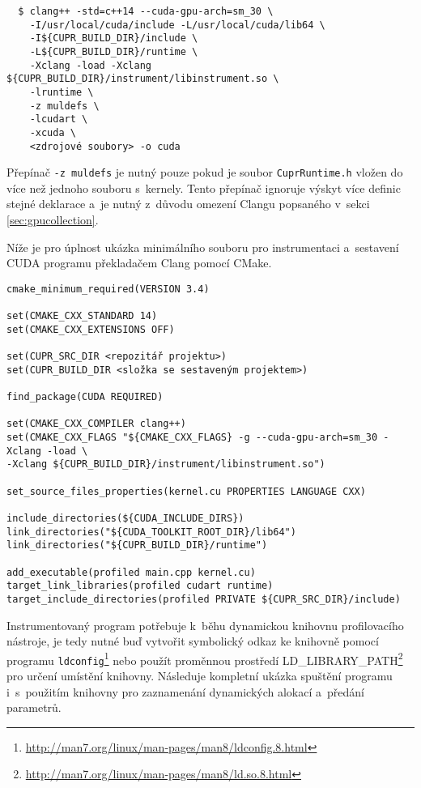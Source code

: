 \noindent
\begin{minipage}{\textwidth}
\begin{verbatim}
  $ clang++ -std=c++14 --cuda-gpu-arch=sm_30 \
	-I/usr/local/cuda/include -L/usr/local/cuda/lib64 \
	-I${CUPR_BUILD_DIR}/include \
	-L${CUPR_BUILD_DIR}/runtime \
	-Xclang -load -Xclang ${CUPR_BUILD_DIR}/instrument/libinstrument.so \
	-lruntime \
	-z muldefs \
	-lcudart \
	-xcuda \
	<zdrojové soubory> -o cuda
\end{verbatim}
\end{minipage}

\vspace{5mm}
Přepínač \texttt{-z\ muldefs} je nutný pouze pokud je soubor \texttt{CuprRuntime.h} vložen do více než jednoho souboru s~kernely. Tento přepínač ignoruje výskyt více definic stejné deklarace a~je nutný z~důvodu omezení Clangu popsaného v~sekci \ref{sec:gpucollection}.

Níže je pro úplnost ukázka minimálního souboru pro instrumentaci a~sestavení CUDA programu překladačem Clang pomocí CMake.


\begin{verbatim}
cmake_minimum_required(VERSION 3.4)

set(CMAKE_CXX_STANDARD 14)
set(CMAKE_CXX_EXTENSIONS OFF)

set(CUPR_SRC_DIR <repozitář projektu>)
set(CUPR_BUILD_DIR <složka se sestaveným projektem>)

find_package(CUDA REQUIRED)

set(CMAKE_CXX_COMPILER clang++)
set(CMAKE_CXX_FLAGS "${CMAKE_CXX_FLAGS} -g --cuda-gpu-arch=sm_30 -Xclang -load \
-Xclang ${CUPR_BUILD_DIR}/instrument/libinstrument.so")

set_source_files_properties(kernel.cu PROPERTIES LANGUAGE CXX)

include_directories(${CUDA_INCLUDE_DIRS})
link_directories("${CUDA_TOOLKIT_ROOT_DIR}/lib64")
link_directories("${CUPR_BUILD_DIR}/runtime")

add_executable(profiled main.cpp kernel.cu)
target_link_libraries(profiled cudart runtime)
target_include_directories(profiled PRIVATE ${CUPR_SRC_DIR}/include)
\end{verbatim}


Instrumentovaný program potřebuje k~běhu dynamickou knihovnu profilovacího nástroje, je tedy nutné buď vytvořit symbolický odkaz ke knihovně pomocí programu \texttt{ldconfig}\footnote{\url{http://man7.org/linux/man-pages/man8/ldconfig.8.html}} nebo použít proměnnou prostředí LD\_LIBRARY\_PATH\footnote{\url{http://man7.org/linux/man-pages/man8/ld.so.8.html}} pro určení umístění knihovny. Následuje kompletní ukázka spuštění programu i~s~použitím knihovny pro zaznamenání dynamických alokací a~předání parametrů.

